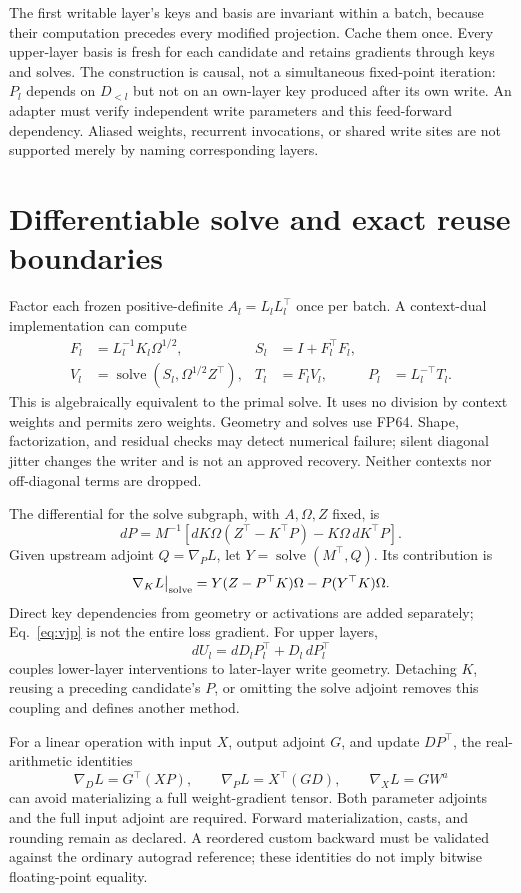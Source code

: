 \documentclass[10pt]{article}
\begin{document}
The first writable layer's keys and basis are invariant within a batch,
because their computation precedes every modified projection. Cache
them once. Every upper-layer basis is fresh for each candidate and
retains gradients through keys and solves. The construction is causal,
not a simultaneous fixed-point iteration: $P_l$ depends on $D_{<l}$ but
not on an own-layer key produced after its own write.
An adapter must verify independent write parameters and this feed-forward
dependency. Aliased weights, recurrent invocations, or shared write sites
are not supported merely by naming corresponding layers.

\newpage
\section{Differentiable solve and exact reuse boundaries}
Factor each frozen positive-definite $A_l=L_lL_l^\top$ once per batch.
A context-dual implementation can compute
\begin{align}
 F_l&=L_l^{-1}K_l\Omega^{1/2}, & S_l&=I+F_l^\top F_l,\\
 V_l&=\operatorname{solve}(S_l,\Omega^{1/2}Z^\top), &
 T_l&=F_lV_l, & P_l&=L_l^{-\top}T_l.
 \label{eq:dual}
\end{align}
This is algebraically equivalent to the primal solve. It uses no
division by context weights and permits zero weights. Geometry and
solves use FP64. Shape, factorization, and residual checks may detect
numerical failure; silent diagonal jitter changes the writer and is not
an approved recovery. Neither contexts nor off-diagonal terms are dropped.

The differential for the solve subgraph, with $A,\Omega,Z$ fixed, is
\[
 dP=M^{-1}\!\left[dK\Omega(Z^\top-K^\top P)
                      -K\Omega\,dK^\top P\right].
\]
Given upstream adjoint $Q=\nabla_P L$, let
$Y=\operatorname{solve}(M^\top,Q)$. Its contribution is
\[
 \nabla_K L\big|_{\rm solve}
 =Y(Z-P^\top K)\Omega-P(Y^\top K)\Omega.
 \label{eq:vjp}
\]
Direct key dependencies from geometry or activations are added separately;
Eq.~\eqref{eq:vjp} is not the entire loss gradient. For upper layers,
\[
 dU_l=dD_lP_l^\top+D_l\,dP_l^\top
\]
couples lower-layer interventions to later-layer write geometry. Detaching
$K$, reusing a preceding candidate's $P$, or omitting the solve adjoint
removes this coupling and defines another method.

For a linear operation with input $X$, output adjoint $G$, and update
$DP^\top$, the real-arithmetic identities
\[
 \nabla_D L=G^\top(XP),\qquad
 \nabla_P L=X^\top(GD),\qquad
 \nabla_X L=GW^a
\]
can avoid materializing a full weight-gradient tensor. Both parameter
adjoints and the full input adjoint are required. Forward
materialization, casts, and rounding remain as declared. A reordered
custom backward must be validated against the ordinary autograd
reference; these identities do not imply bitwise floating-point equality.
\end{document}
